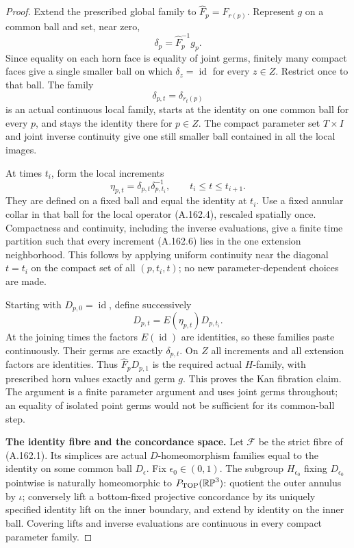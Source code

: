 \begin{proof}
Extend the prescribed global family to $\widehat F_p=F_{r(p)}$.
Represent $g$ on a common ball and set, near zero,
\[
 \delta_p=\widehat F_p^{-1}g_p.
\]
Since equality on each horn face is equality of joint germs, finitely
many compact faces give a single smaller ball on which
$\delta_z=\operatorname{id}$ for every $z\in Z$. Restrict once to that
ball. The family
\[
 \delta_{p,t}=\delta_{r_t(p)}
 \tag{A.162.5}
\]
is an actual continuous local family, starts at the identity on one
common ball for every $p$, and stays the identity there for $p\in Z$.
The compact parameter set $T\times I$ and joint inverse continuity give
one still smaller ball contained in all the local images.

At times $t_i$, form the local increments
\[
 \eta_{p,t}=\delta_{p,t}\delta_{p,t_i}^{-1},
       \qquad t_i\le t\le t_{i+1}.
 \tag{A.162.6}
\]
They are defined on a fixed ball and equal the identity at $t_i$.
Use a fixed annular collar in that ball for the local operator (A.162.4),
rescaled spatially once. Compactness and continuity, including the
inverse evaluations, give a finite time partition such that every
increment (A.162.6) lies in the one extension neighborhood. This follows
by applying uniform continuity near the diagonal $t=t_i$ on the compact
set of all $(p,t_i,t)$; no new parameter-dependent choices are made.

Starting with $D_{p,0}=\operatorname{id}$, define successively
\[
 D_{p,t}=E(\eta_{p,t})D_{p,t_i}.
 \tag{A.162.7}
\]
At the joining times the factors $E(\operatorname{id})$ are identities,
so these families paste continuously. Their germs are exactly
$\delta_{p,t}$. On $Z$ all increments and all extension factors are
identities. Thus $\widehat F_pD_{p,1}$ is the required actual $H$-family,
with prescribed horn values exactly and germ $g$. This proves the Kan
fibration claim. The argument is a finite parameter argument and uses
joint germs throughout; an equality of isolated point germs would not
be sufficient for its common-ball step.

\textbf{The identity fibre and the concordance space.}\quad
Let $\mathcal F$ be the strict fibre of (A.162.1). Its simplices are actual
$D$-homeomorphism families equal to the identity on some common ball
$D_\epsilon$. Fix $\epsilon_0\in(0,1)$. The subgroup $H_{\epsilon_0}$
fixing $D_{\epsilon_0}$ pointwise is naturally homeomorphic to
$P_{\rm TOP}(\mathbb {RP}^3)$: quotient the outer annulus by $\iota$;
conversely lift a bottom-fixed projective concordance by its uniquely
specified identity lift on the inner boundary, and extend by identity
on the inner ball. Covering lifts and inverse evaluations are continuous
in every compact parameter family.


\end{proof}
